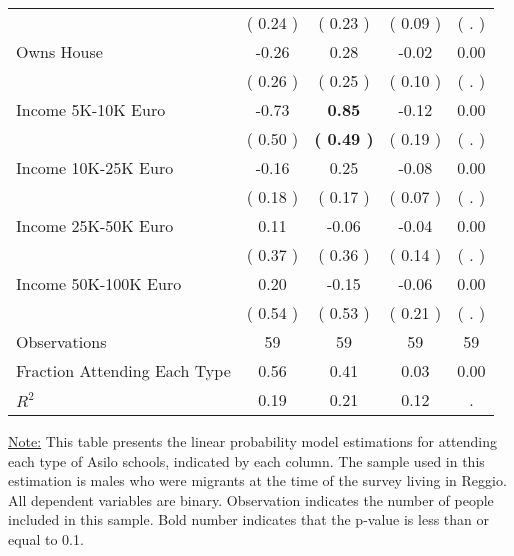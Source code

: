 \begin{table}[H]
{\begin{tabular}{lcccc}
\quad  & (     0.24 ) & (     0.23 )  & (     0.09 )  & (        . )  \\
\quad Owns House &     -0.26 &      0.28 &     -0.02 &      0.00 \\
\quad  & (     0.26 ) & (     0.25 )  & (     0.10 )  & (        . )  \\
\quad Income 5K-10K Euro &     -0.73 & \textbf{     0.85} &     -0.12 &      0.00 \\
\quad  & (     0.50 ) & \textbf{(     0.49 )}  & (     0.19 )  & (        . )  \\
\quad Income 10K-25K Euro &     -0.16 &      0.25 &     -0.08 &      0.00 \\
\quad  & (     0.18 ) & (     0.17 )  & (     0.07 )  & (        . )  \\
\quad Income 25K-50K Euro &      0.11 &     -0.06 &     -0.04 &      0.00 \\
\quad  & (     0.37 ) & (     0.36 )  & (     0.14 )  & (        . )  \\
\quad Income 50K-100K Euro &      0.20 &     -0.15 &     -0.06 &      0.00 \\
\quad  & (     0.54 ) & (     0.53 )  & (     0.21 )  & (        . )  \\
\midrule
Observations & 59 & 59 & 59 & 59 \\
Fraction Attending Each Type &      0.56 &      0.41 &      0.03 &      0.00 \\
\midrule
$ R^2$ &      0.19 &      0.21 &      0.12 &         . \\
\bottomrule
\end{tabular}}
\end{table}
\begin{footnotesize}
\noindent\underline{Note:} This table presents the linear probability model estimations for attending each type of Asilo schools, indicated by each column. The sample used in this estimation is males who were migrants at the time of the survey living in Reggio. All dependent variables are binary. Observation indicates the number of people included in this sample. Bold number indicates that the p-value is less than or equal to 0.1.
\end{footnotesize}
